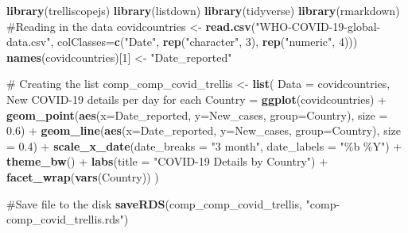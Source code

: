 \documentclass[
]{article}
\newenvironment{Shaded}{\begin{snugshade}}{\end{snugshade}}
\newcommand{\CommentTok}[1]{\textcolor[rgb]{0.54,0.53,0.53}{#1}}
\newcommand{\DataTypeTok}[1]{\textcolor[rgb]{0.00,0.34,0.68}{#1}}
\newcommand{\DecValTok}[1]{\textcolor[rgb]{0.69,0.50,0.00}{#1}}
\newcommand{\FloatTok}[1]{\textcolor[rgb]{0.69,0.50,0.00}{#1}}
\newcommand{\KeywordTok}[1]{\textcolor[rgb]{0.12,0.11,0.11}{\textbf{#1}}}
\newcommand{\NormalTok}[1]{\textcolor[rgb]{0.12,0.11,0.11}{#1}}
\newcommand{\OperatorTok}[1]{\textcolor[rgb]{0.12,0.11,0.11}{#1}}
\newcommand{\StringTok}[1]{\textcolor[rgb]{0.75,0.01,0.01}{#1}}
\begin{document}
\begin{Shaded}
\begin{Highlighting}[]
\KeywordTok{library}\NormalTok{(trelliscopejs)}
\KeywordTok{library}\NormalTok{(listdown)}
\KeywordTok{library}\NormalTok{(tidyverse)}
\KeywordTok{library}\NormalTok{(rmarkdown)}
\CommentTok{\#Reading in the data}
\NormalTok{covidcountries \textless{}{-}}\StringTok{ }\KeywordTok{read.csv}\NormalTok{(}\StringTok{"WHO{-}COVID{-}19{-}global{-}data.csv"}\NormalTok{,}
                     \DataTypeTok{colClasses=}\KeywordTok{c}\NormalTok{(}\StringTok{"Date"}\NormalTok{, }\KeywordTok{rep}\NormalTok{(}\StringTok{"character"}\NormalTok{, }\DecValTok{3}\NormalTok{), }
                                   \KeywordTok{rep}\NormalTok{(}\StringTok{"numeric"}\NormalTok{, }\DecValTok{4}\NormalTok{))) }
\KeywordTok{names}\NormalTok{(covidcountries)[}\DecValTok{1}\NormalTok{] \textless{}{-}}\StringTok{ "Date\_reported"}

\CommentTok{\# Creating the list}
\NormalTok{comp\_comp\_covid\_trellis \textless{}{-}}\StringTok{ }\KeywordTok{list}\NormalTok{(}
  \DataTypeTok{Data =}\NormalTok{ covidcountries,}
  \StringTok{\textasciigrave{}}\DataTypeTok{New COVID{-}19 details per day for each Country}\StringTok{\textasciigrave{}}\NormalTok{ =}\StringTok{ }\KeywordTok{ggplot}\NormalTok{(covidcountries) }\OperatorTok{+}
\StringTok{    }\KeywordTok{geom\_point}\NormalTok{(}\KeywordTok{aes}\NormalTok{(}\DataTypeTok{x=}\NormalTok{Date\_reported, }\DataTypeTok{y=}\NormalTok{New\_cases, }\DataTypeTok{group=}\NormalTok{Country), }\DataTypeTok{size =} \FloatTok{0.6}\NormalTok{) }\OperatorTok{+}\StringTok{ }
\StringTok{    }\KeywordTok{geom\_line}\NormalTok{(}\KeywordTok{aes}\NormalTok{(}\DataTypeTok{x=}\NormalTok{Date\_reported, }\DataTypeTok{y=}\NormalTok{New\_cases, }\DataTypeTok{group=}\NormalTok{Country), }\DataTypeTok{size =} \FloatTok{0.4}\NormalTok{) }\OperatorTok{+}
\StringTok{    }\KeywordTok{scale\_x\_date}\NormalTok{(}\DataTypeTok{date\_breaks =} \StringTok{"3 month"}\NormalTok{, }\DataTypeTok{date\_labels =}  \StringTok{"\%b \%Y"}\NormalTok{) }\OperatorTok{+}
\StringTok{    }\KeywordTok{theme\_bw}\NormalTok{() }\OperatorTok{+}
\StringTok{    }\KeywordTok{labs}\NormalTok{(}\DataTypeTok{title =} \StringTok{"COVID{-}19 Details by Country"}\NormalTok{) }\OperatorTok{+}\StringTok{ }
\StringTok{    }\KeywordTok{facet\_wrap}\NormalTok{(}\KeywordTok{vars}\NormalTok{(Country))}
\NormalTok{  )}

\CommentTok{\#Save file to the disk}
\KeywordTok{saveRDS}\NormalTok{(comp\_comp\_covid\_trellis, }\StringTok{"comp{-}comp\_covid\_trellis.rds"}\NormalTok{)}
 

\end{Highlighting}
\end{Shaded}
\end{document}
